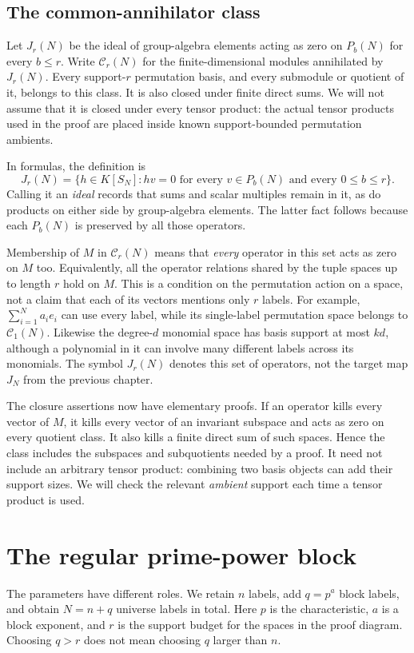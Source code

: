 \documentclass[11pt,a4paper,oneside,openany]{book}
\theoremstyle{definition}\newtheorem{definition}[theorem]{Definition}
\theoremstyle{remark}\newtheorem{remark}[theorem]{Remark}
\numberwithin{equation}{chapter}
\begin{document}
\subsection*{The common-annihilator class}
Let $J_r(N)$ be the ideal of group-algebra elements acting as zero on
$P_b(N)$ for every $b\le r$. Write $\mathcal C_r(N)$ for the
finite-dimensional modules annihilated by $J_r(N)$. Every support-$r$
permutation basis, and every submodule or quotient of it, belongs to this
class. It is also closed under finite direct sums. We will not assume
that it is closed under every tensor product: the actual tensor products
used in the proof are placed inside known support-bounded permutation
ambients.

In formulas, the definition is
\[
 J_r(N)=\{h\in K[S_N]:h v=0\text{ for every }v\in P_b(N)
                                  \text{ and every }0\le b\le r\}.
\]
Calling it an \emph{ideal} records that sums and scalar multiples
remain in it, as do products on either side by group-algebra
elements. The latter fact follows because each $P_b(N)$ is preserved
by all those operators.

Membership of $M$ in $\mathcal C_r(N)$ means that \emph{every}
operator in this set acts as zero on $M$ too. Equivalently, all the
operator relations shared by the tuple spaces up to length $r$ hold
on $M$. This is a condition on the permutation action on a space,
not a claim that each of its vectors mentions only $r$ labels.
For example, $\sum_{i=1}^N a_i e_i$ can use every label, while its
single-label permutation space belongs to $\mathcal C_1(N)$.
Likewise the degree-$d$ monomial space has basis support at most
$kd$, although a polynomial in it can involve many different labels
across its monomials.
The symbol $J_r(N)$ denotes this set of operators, not the target
map $J_N$ from the previous chapter.

The closure assertions now have elementary proofs. If an operator
kills every vector of $M$, it kills every vector of an invariant
subspace and acts as zero on every quotient class. It also kills
a finite direct sum of such spaces. Hence the class includes the
subspaces and subquotients needed by a proof. It need not include
an arbitrary tensor product: combining two basis objects can add
their support sizes. We will check the relevant \emph{ambient}
support each time a tensor product is used.

\section{The regular prime-power block}
The parameters have different roles. We retain $n$ labels, add
$q=p^a$ block labels, and obtain $N=n+q$ universe labels in total.
Here $p$ is the characteristic, $a$ is a block exponent, and $r$
is the support budget for the spaces in the proof diagram. Choosing
$q>r$ does not mean choosing $q$ larger than $n$.
\end{document}
